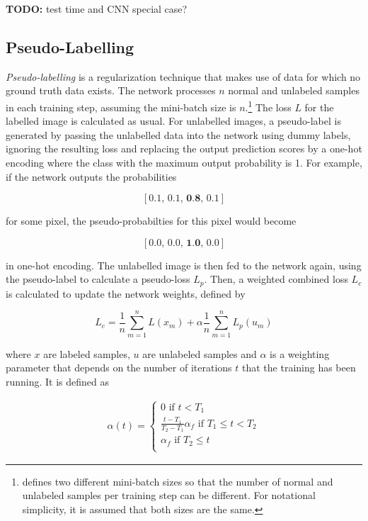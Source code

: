 \textbf{TODO:} test time and CNN special case?


	\subsection {Pseudo-Labelling}
\label{subsec:pseudo_label}
\textit{Pseudo-labelling} \cite{pseudo_label} is a regularization technique that makes use of data for which no ground truth data exists. The network processes $n$ normal and unlabeled samples in each training step, assuming the mini-batch size is $n$.\footnote{\cite{pseudo_label} defines two different mini-batch sizes so that the number of normal and unlabeled samples per training step can be different. For notational simplicity, it is assumed that both sizes are the same.} The loss $L$ for the labelled image is calculated as usual. For unlabelled images, a pseudo-label is generated by passing the unlabelled data into the network using dummy labels, ignoring the resulting loss and replacing the output prediction scores by a one-hot encoding where the class with the maximum output probability is 1. For example, if the network outputs the probabilities 

\[ [0.1,\, 0.1,\, \textbf{0.8},\, 0.1] \]

\noindent for some pixel, the pseudo-probabilties for this pixel would become

\[ [0.0,\, 0.0,\, \textbf{1.0},\, 0.0] \]

\noindent in one-hot encoding. The unlabelled image is then fed to the network again, using the pseudo-label to calculate a pseudo-loss $L_p$. Then, a weighted combined loss $L_c$ is calculated to update the network weights, defined by

\[ L_c = \frac{1}{n} \sum \limits_{m=1}^{n} L(x_m) + \alpha \frac{1}{n} \sum \limits_{m=1}^{n} L_p(u_m)  \]

\noindent where $x$ are labeled samples, $u$ are unlabeled samples and $\alpha$ is a weighting parameter that depends on the number of iterations $t$ that the training has been running. It is defined as

\begin {align}
\alpha(t) = \begin{cases} 0 \text{ if } t < T_1 \\
				\frac{t - T_1}{T_2 - T_1} \alpha_f \text{ if } T_1 \leq t < T_2 \\
				\alpha_f \text { if } T_2 \leq t \\
	        \end{cases}
\end {align}

